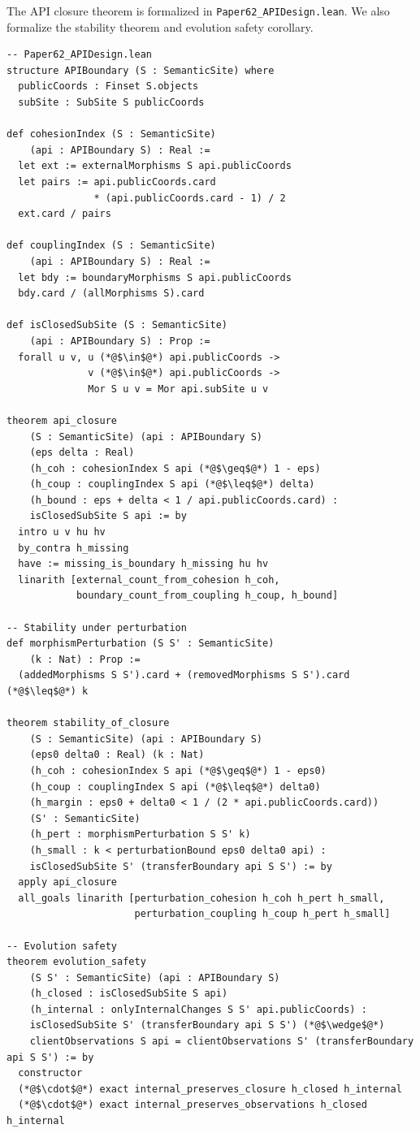 \documentclass[11pt]{article}
\begin{document}
The API closure theorem is formalized in \texttt{Paper62\_APIDesign.lean}.
We also formalize the stability theorem and evolution safety corollary.

\begin{lstlisting}[style=jugeo-python,title=Lean 4 Formalization Sketch]
-- Paper62_APIDesign.lean
structure APIBoundary (S : SemanticSite) where
  publicCoords : Finset S.objects
  subSite : SubSite S publicCoords

def cohesionIndex (S : SemanticSite)
    (api : APIBoundary S) : Real :=
  let ext := externalMorphisms S api.publicCoords
  let pairs := api.publicCoords.card
               * (api.publicCoords.card - 1) / 2
  ext.card / pairs

def couplingIndex (S : SemanticSite)
    (api : APIBoundary S) : Real :=
  let bdy := boundaryMorphisms S api.publicCoords
  bdy.card / (allMorphisms S).card

def isClosedSubSite (S : SemanticSite)
    (api : APIBoundary S) : Prop :=
  forall u v, u (*@$\in$@*) api.publicCoords ->
              v (*@$\in$@*) api.publicCoords ->
              Mor S u v = Mor api.subSite u v

theorem api_closure
    (S : SemanticSite) (api : APIBoundary S)
    (eps delta : Real)
    (h_coh : cohesionIndex S api (*@$\geq$@*) 1 - eps)
    (h_coup : couplingIndex S api (*@$\leq$@*) delta)
    (h_bound : eps + delta < 1 / api.publicCoords.card) :
    isClosedSubSite S api := by
  intro u v hu hv
  by_contra h_missing
  have := missing_is_boundary h_missing hu hv
  linarith [external_count_from_cohesion h_coh,
            boundary_count_from_coupling h_coup, h_bound]

-- Stability under perturbation
def morphismPerturbation (S S' : SemanticSite)
    (k : Nat) : Prop :=
  (addedMorphisms S S').card + (removedMorphisms S S').card (*@$\leq$@*) k

theorem stability_of_closure
    (S : SemanticSite) (api : APIBoundary S)
    (eps0 delta0 : Real) (k : Nat)
    (h_coh : cohesionIndex S api (*@$\geq$@*) 1 - eps0)
    (h_coup : couplingIndex S api (*@$\leq$@*) delta0)
    (h_margin : eps0 + delta0 < 1 / (2 * api.publicCoords.card))
    (S' : SemanticSite)
    (h_pert : morphismPerturbation S S' k)
    (h_small : k < perturbationBound eps0 delta0 api) :
    isClosedSubSite S' (transferBoundary api S S') := by
  apply api_closure
  all_goals linarith [perturbation_cohesion h_coh h_pert h_small,
                      perturbation_coupling h_coup h_pert h_small]

-- Evolution safety
theorem evolution_safety
    (S S' : SemanticSite) (api : APIBoundary S)
    (h_closed : isClosedSubSite S api)
    (h_internal : onlyInternalChanges S S' api.publicCoords) :
    isClosedSubSite S' (transferBoundary api S S') (*@$\wedge$@*)
    clientObservations S api = clientObservations S' (transferBoundary api S S') := by
  constructor
  (*@$\cdot$@*) exact internal_preserves_closure h_closed h_internal
  (*@$\cdot$@*) exact internal_preserves_observations h_closed h_internal
\end{lstlisting}
\end{document}
